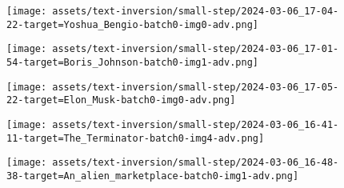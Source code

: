 \begin{figure*}[h]
\vspace{1ex}
\begin{minipage}[t]{.025\textwidth}
     \vspace{0pt}
\end{minipage}%
\hspace{1ex}
\begin{minipage}[t]{0.98\figwidth}
    \vspace{0pt}
    \begin{subfigure}[t]{0.2\textwidth}
        \texttt{[image: assets/text-inversion/small-step/2024-03-06\_17-04-22-target=Yoshua\_Bengio-batch0-img0-adv.png]}
    \end{subfigure}%
    \begin{subfigure}[t]{0.2\textwidth}
        \texttt{[image: assets/text-inversion/small-step/2024-03-06\_17-01-54-target=Boris\_Johnson-batch0-img1-adv.png]}
    \end{subfigure}%
    \begin{subfigure}[t]{0.2\textwidth}
        \texttt{[image: assets/text-inversion/small-step/2024-03-06\_17-05-22-target=Elon\_Musk-batch0-img0-adv.png]}
    \end{subfigure}%
    \begin{subfigure}[t]{0.2\textwidth}
        \texttt{[image: assets/text-inversion/small-step/2024-03-06\_16-41-11-target=The\_Terminator-batch0-img4-adv.png]}
    \end{subfigure}%
    \begin{subfigure}[t]{0.2\textwidth}
        \texttt{[image: assets/text-inversion/small-step/2024-03-06\_16-48-38-target=An\_alien\_marketplace-batch0-img1-adv.png]}
    \end{subfigure}%
\end{minipage}


\end{figure*}
